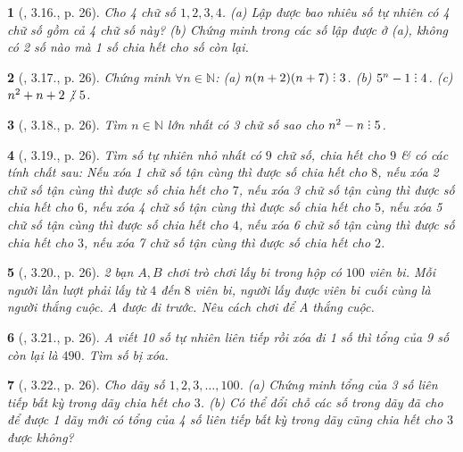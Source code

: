 \documentclass{article}
\newtheorem{baitoan}{}
\DeclareRobustCommand{\divby}{%
	\mathrel{\vbox{\baselineskip.65ex\lineskiplimit0pt\hbox{.}\hbox{.}\hbox{.}}}%
}
\begin{document}
\begin{baitoan}[\cite{TLCT_THCS_Toan_6_so_hoc}, 3.16., p. 26]
	Cho 4 chữ số $1,2,3,4$. (a) Lập được bao nhiêu số tự nhiên có 4 chữ số gồm cả 4 chữ số này? (b) Chứng minh trong các số lập được ở (a), không có 2 số nào mà 1 số chia hết cho số còn lại.
\end{baitoan}

\begin{baitoan}[\cite{TLCT_THCS_Toan_6_so_hoc}, 3.17., p. 26]
	Chứng minh $\forall n\in\mathbb{N}$: (a) $n(n + 2)(n + 7)\divby3$. (b) $5^n - 1\divby4$. (c) $n^2 + n + 2\not{\divby}\ 5$.
\end{baitoan}

\begin{baitoan}[\cite{TLCT_THCS_Toan_6_so_hoc}, 3.18., p. 26]
	Tìm $n\in\mathbb{N}$ lớn nhất có 3 chữ số sao cho $n^2 - n\divby5$.
\end{baitoan}

\begin{baitoan}[\cite{TLCT_THCS_Toan_6_so_hoc}, 3.19., p. 26]
	Tìm số tự nhiên nhỏ nhất có $9$ chữ số, chia hết cho $9$ \& có các tính chất sau: Nếu xóa 1 chữ số tận cùng thì được số chia hết cho $8$, nếu xóa 2 chữ số tận cùng thì được số chia hết cho $7$, nếu xóa 3 chữ số tận cùng thì được số chia hết cho $6$, nếu xóa 4 chữ số tận cùng thì được số chia hết cho $5$, nếu xóa 5 chữ số tận cùng thì được số chia hết cho $4$, nếu xóa 6 chữ số tận cùng thì được số chia hết cho $3$, nếu xóa 7 chữ số tận cùng thì được số chia hết cho $2$.
\end{baitoan}

\begin{baitoan}[\cite{TLCT_THCS_Toan_6_so_hoc}, 3.20., p. 26]
	2 bạn $A,B$ chơi trò chơi lấy bi trong hộp có $100$ viên bi. Mỗi người lần lượt phải lấy từ $4$ đến $8$ viên bi, người lấy được viên bi cuối cùng là người thắng cuộc. A được đi trước. Nêu cách chơi để A thắng cuộc.
\end{baitoan}

\begin{baitoan}[\cite{TLCT_THCS_Toan_6_so_hoc}, 3.21., p. 26]
	A viết 10 số tự nhiên liên tiếp rồi xóa đi 1 số thì tổng của 9 số còn lại là $490$. Tìm số bị xóa.
\end{baitoan}

\begin{baitoan}[\cite{TLCT_THCS_Toan_6_so_hoc}, 3.22., p. 26]
	Cho dãy số $1,2,3,\ldots,100$. (a) Chứng minh tổng của 3 số liên tiếp bất kỳ trong dãy chia hết cho $3$. (b) Có thể đổi chỗ các số trong dãy đã cho để được 1 dãy mới có tổng của 4 số liên tiếp bất kỳ trong dãy cũng chia hết cho $3$ được không?
\end{baitoan}
\end{document}
